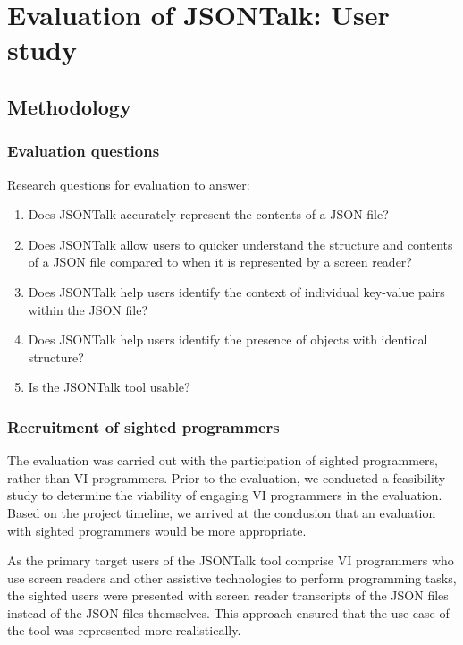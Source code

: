 \documentclass{l4proj}
\begin{document}
\chapter{Evaluation of JSONTalk: User study} 

\section{Methodology}



\subsection{Evaluation questions}
Research questions for evaluation to answer:
\begin{enumerate}
\item Does JSONTalk accurately represent the contents of a JSON file?
\item Does JSONTalk allow users to quicker understand the structure and contents of a JSON file compared to when it is represented by a screen reader?
\item Does JSONTalk help users identify the context of individual key-value pairs within the JSON file?
\item Does JSONTalk help users identify the presence of objects with identical structure?
\item Is the JSONTalk tool usable?
\end{enumerate}

\subsection{Recruitment of sighted programmers}
The evaluation was carried out with the participation of sighted programmers, rather than VI programmers. Prior to the evaluation, we conducted a feasibility study to determine the viability of engaging VI programmers in the evaluation. Based on the project timeline, we arrived at the conclusion that an evaluation with sighted programmers would be more appropriate.

As the primary target users of the JSONTalk tool comprise VI programmers who use screen readers and other assistive technologies to perform programming tasks, the sighted users were presented with screen reader transcripts of the JSON files instead of the JSON files themselves. This approach ensured that the use case of the tool was represented more realistically.
\end{document}
